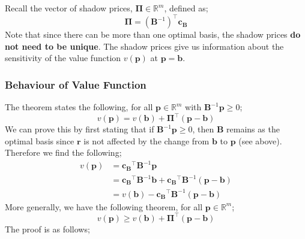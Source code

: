 \documentclass[a4paper, 12pt]{article}
\newcommand{\mat}[1]{\boldsymbol{#1}}
\renewcommand{\vec}[1]{\boldsymbol{#1}}
\begin{document}
                Recall the vector of shadow prices, $\vec{\Pi} \in \mathbb{R}^m$, defined as;
                $$\vec{\Pi} = \left(\mat{B}^{-1}\right)^\top\vec{c_B}$$
                Note that since there can be more than one optimal basis, the shadow prices \textbf{do not need to be unique}.
                The shadow prices give us information about the sensitivity of the value function $v(\vec{p})$ at $\vec{p} = \vec{b}$.
            \subsubsection*{Behaviour of Value Function}
                The theorem states the following, for all $\vec{p} \in \mathbb{R}^m$ with $\mat{B}^{-1}\vec{p} \geq 0$;
                $$v(\vec{p}) = v(\vec{b}) + \vec{\Pi}^\top(\vec{p} - \vec{b})$$
                We can prove this by first stating that if $\mat{B}^{-1}\vec{p} \geq 0$, then $\mat{B}$ remains as the optimal basis since $\vec{r}$ is not affected by the change from $\vec{b}$ to $\vec{p}$ (see above).
                Therefore we find the following;
                \begin{align*}
                    v(\vec{p}) & = \vec{c_B}^\top\mat{B}^{-1}\vec{p} \\
                    & = \vec{c_B}^\top\mat{B}^{-1}\vec{b} + \vec{c_B}^\top\mat{B}^{-1}(\vec{p} - \vec{b}) \\
                    & = v(\vec{b}) - \vec{c_B}^\top\mat{B}^{-1}(\vec{p} - \vec{b})
                \end{align*}
                More generally, we have the following theorem, for all $\vec{p} \in \mathbb{R}^m$;
                $$v(\vec{p}) \geq v(\vec{b}) + \vec{\Pi}^\top(\vec{p} - \vec{b})$$
                The proof is as follows;
\end{document}
